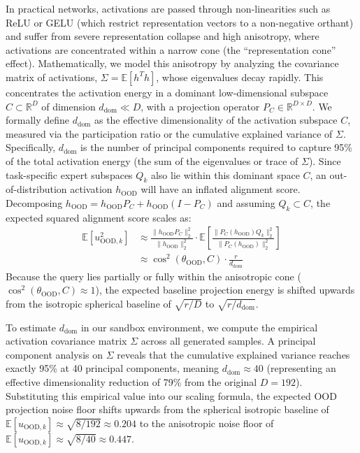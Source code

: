 In practical networks, activations are passed through non-linearities such as ReLU or GELU (which restrict representation vectors to a non-negative orthant) and suffer from severe representation collapse and high anisotropy, where activations are concentrated within a narrow cone (the ``representation cone'' effect). Mathematically, we model this anisotropy by analyzing the covariance matrix of activations, $\Sigma = \mathbb{E}[h^T h]$, whose eigenvalues decay rapidly. This concentrates the activation energy in a dominant low-dimensional subspace $C \subset \mathbb{R}^D$ of dimension $d_{\text{dom}} \ll D$, with a projection operator $P_C \in \mathbb{R}^{D \times D}$. We formally define $d_{\text{dom}}$ as the effective dimensionality of the activation subspace $C$, measured via the participation ratio or the cumulative explained variance of $\Sigma$. Specifically, $d_{\text{dom}}$ is the number of principal components required to capture 95\% of the total activation energy (the sum of the eigenvalues or trace of $\Sigma$). Since task-specific expert subspaces $Q_k$ also lie within this dominant space $C$, an out-of-distribution activation $h_{\text{OOD}}$ will have an inflated alignment score. Decomposing $h_{\text{OOD}} = h_{\text{OOD}} P_C + h_{\text{OOD}} (I - P_C)$ and assuming $Q_k \subset C$, the expected squared alignment score scales as:
\begin{equation}
\begin{split}
    \mathbb{E}[u_{\text{OOD}, k}^2] &\approx \frac{\parallel h_{\text{OOD}} P_C \parallel_2^2}{\parallel h_{\text{OOD}} \parallel_2^2} \cdot \mathbb{E} \left[ \frac{\parallel P_C(h_{\text{OOD}}) Q_k \parallel_2^2}{\parallel P_C(h_{\text{OOD}}) \parallel_2^2} \right] \\
    &\approx \cos^2(\theta_{\text{OOD}}, C) \cdot \frac{r}{d_{\text{dom}}}
\end{split}
\end{equation}
Because the query lies partially or fully within the anisotropic cone ($\cos^2(\theta_{\text{OOD}}, C) \approx 1$), the expected baseline projection energy is shifted upwards from the isotropic spherical baseline of $\sqrt{r/D}$ to $\sqrt{r / d_{\text{dom}}}$. 

To estimate $d_{\text{dom}}$ in our sandbox environment, we compute the empirical activation covariance matrix $\Sigma$ across all generated samples. A principal component analysis on $\Sigma$ reveals that the cumulative explained variance reaches exactly 95\% at 40 principal components, meaning $d_{\text{dom}} \approx 40$ (representing an effective dimensionality reduction of 79\% from the original $D=192$). Substituting this empirical value into our scaling formula, the expected OOD projection noise floor shifts upwards from the spherical isotropic baseline of $\mathbb{E}[u_{\text{OOD}, k}] \approx \sqrt{8/192} \approx 0.204$ to the anisotropic noise floor of $\mathbb{E}[u_{\text{OOD}, k}] \approx \sqrt{8/40} \approx 0.447$.

